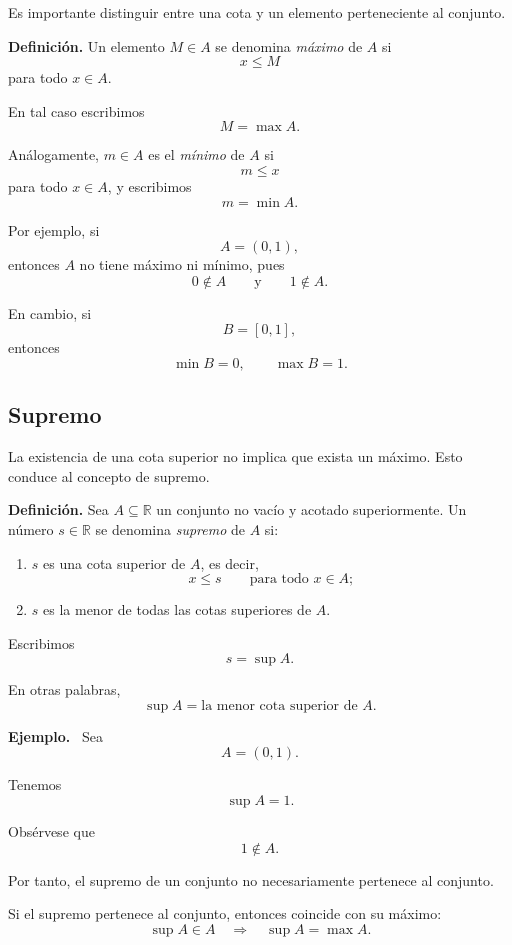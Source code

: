 \documentclass[12pt]{article}
\newenvironment{Ejem}
{\par\medskip\noindent\textbf{Ejemplo.}\ }
{\par\medskip}
\begin{document}
{Es importante distinguir entre una cota y un elemento perteneciente al
conjunto.

\textbf{Definición.}
Un elemento $M\in A$ se denomina \emph{máximo} de $A$ si
\[
x\leq M
\]
para todo $x\in A$.

En tal caso escribimos
\[
M=\max A.
\]

Análogamente, $m\in A$ es el \emph{mínimo} de $A$ si
\[
m\leq x
\]
para todo $x\in A$, y escribimos
\[
m=\min A.
\]

Por ejemplo, si
\[
A=(0,1),
\]
entonces $A$ no tiene máximo ni mínimo, pues
\[
0\notin A
\qquad\text{y}\qquad
1\notin A.
\]

En cambio, si
\[
B=[0,1],
\]
entonces
\[
\min B=0,
\qquad
\max B=1.
\]

\subsection{Supremo}

La existencia de una cota superior no implica que exista un máximo.
Esto conduce al concepto de supremo.

\textbf{Definición.}
Sea $A\subseteq\mathbb{R}$ un conjunto no vacío y acotado superiormente.
Un número $s\in\mathbb{R}$ se denomina \emph{supremo} de $A$ si:

\begin{enumerate}
    \item $s$ es una cota superior de $A$, es decir,
    \[
    x\leq s
    \qquad\text{para todo }x\in A;
    \]

    \item $s$ es la menor de todas las cotas superiores de $A$.
\end{enumerate}

Escribimos
\[
s=\sup A.
\]

En otras palabras,
\[
\boxed{
\sup A=\text{la menor cota superior de }A.
}
\]

\begin{Ejem}
Sea
\[
A=(0,1).
\]

Tenemos
\[
\sup A=1.
\]

Obsérvese que
\[
1\notin A.
\]

Por tanto, el supremo de un conjunto no necesariamente pertenece al
conjunto.
\end{Ejem}

Si el supremo pertenece al conjunto, entonces coincide con su máximo:
\[
\sup A\in A
\quad\Longrightarrow\quad
\sup A=\max A.
\]

}
\end{document}
